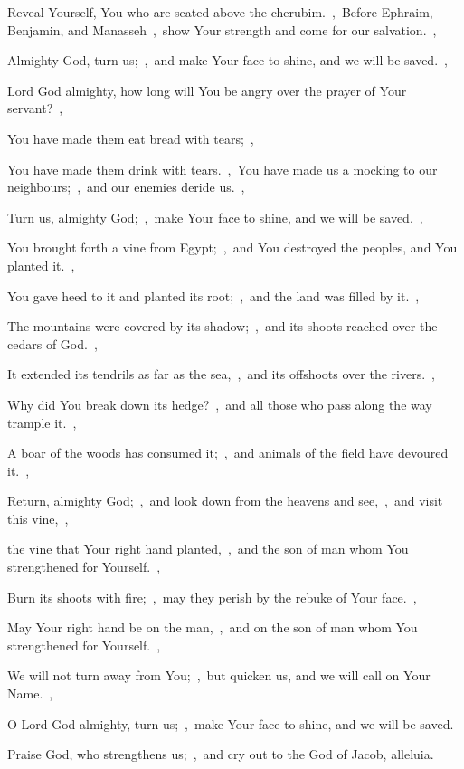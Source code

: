 \documentclass[12pt,twoside,a5paper]{article}
\begin{document}
\begin{halfparskip}
  Reveal Yourself, You who are seated above the cherubim.~\sep\ Before Ephraim, Benjamin, and Manasseh~\sep\ show Your strength and come for our salvation.~\sep

  Almighty God, turn us;~\sep\ and make Your face to shine, and we will be saved.~\sep

  Lord God almighty, how long will You be angry over the prayer of Your servant?~\sep

  You have made them eat bread with tears;~\sep

  You have made them drink with tears.~\sep\ You have made us a mocking to our neighbours;~\sep\ and our enemies deride us.~\sep

  Turn us, almighty God;~\sep\ make Your face to shine, and we will be saved.~\sep

  You brought forth a vine from Egypt;~\sep\ and You destroyed the peoples, and You planted it.~\sep

  You gave heed to it and planted its root;~\sep\ and the land was filled by it.~\sep

  The mountains were covered by its shadow;~\sep\ and its shoots reached over the cedars of God.~\sep

  It extended its tendrils as far as the sea,~\sep\ and its offshoots over the rivers.~\sep

  Why did You break down its hedge?~\sep\ and all those who pass along the way trample it.~\sep

  A boar of the woods has consumed it;~\sep\ and animals of the field have devoured it.~\sep

  Return, almighty God;~\sep\ and look down from the heavens and see,~\sep\ and visit this vine,~\sep

  the vine that Your right hand planted,~\sep\ and the son of man whom You strengthened for Yourself.~\sep

  Burn its shoots with fire;~\sep\ may they perish by the rebuke of Your face.~\sep

  May Your right hand be on the man,~\sep\ and on the son of man whom You strengthened for Yourself.~\sep

  We will not turn away from You;~\sep\ but quicken us, and we will call on Your Name.~\sep

  O Lord God almighty, turn us;~\sep\ make Your face to shine, and we will be saved.

   Praise God, who strengthens us;~\sep\ and cry out to the God of Jacob, alleluia.


\end{halfparskip}
\end{document}
